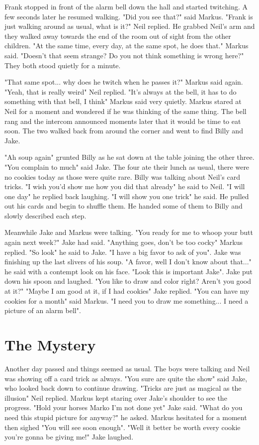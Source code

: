 \documentclass[12pt]{book}
\begin{document}
Frank stopped in front of the alarm bell down the hall and started twitching. A few seconds later he resumed walking. "Did you see that?" said Markus. "Frank is just walking around as usual, what is it?" Neil replied. He grabbed Neil's arm and they walked away towards the end of the room out of sight from the other children. "At the same time, every day, at the same spot, he does that." Markus said. "Doesn't that seem strange? Do you not think something is wrong here?" They both stood quietly for a minute.

"That same spot... why does he twitch when he passes it?" Markus said again. "Yeah, that is really weird" Neil replied. "It's always at the bell, it has to do something with that bell, I think" Markus said very quietly. Markus stared at Neil for a moment and wondered if he was thinking of the same thing. The bell rang and the intercom announced moments later that it would be time to eat soon. The two walked back from around the corner and went to find Billy and Jake.

"Ah soup again" grunted Billy as he sat down at the table joining the other three. "You complain to much" said Jake. The four ate their lunch as usual, there were no cookies today as those were quite rare. Billy was talking about Neil's card tricks. "I wish you'd show me how you did that already" he said to Neil. "I will one day" he replied back laughing. "I will show you one trick" he said. He pulled out his cards and begin to shuffle them. He handed some of them to Billy and slowly described each step.

Meanwhile Jake and Markus were talking. "You ready for me to whoop your butt again next week?" Jake had said. "Anything goes, don't be too cocky" Markus replied. "So look" he said to Jake. "I have a big favor to ask of you". Jake was finishing up the last slivers of his soup. "A favor, well I don't know about that..." he said with a contempt look on his face. "Look this is important Jake". Jake put down his spoon and laughed. "You like to draw and color right? Aren't you good at it?" "Maybe I am good at it, if I had cookies" Jake replied. "You can have my cookies for a month" said Markus. "I need you to draw me something... I need a picture of an alarm bell".

\chapter{The Mystery}

Another day passed and things seemed as usual. The boys were talking and Neil was showing off a card trick as always. "You sure are quite the show" said Jake, who looked back down to continue drawing. "Tricks are just as magical as the illusion" Neil replied. Markus kept staring over Jake's shoulder to see the progress. "Hold your horses Marko I'm not done yet" Jake said. "What do you need this stupid picture for anyway?" he asked. Markus hesitated for a moment then sighed "You will see soon enough". "Well it better be worth every cookie you're gonna be giving me!" Jake laughed.
\end{document}
